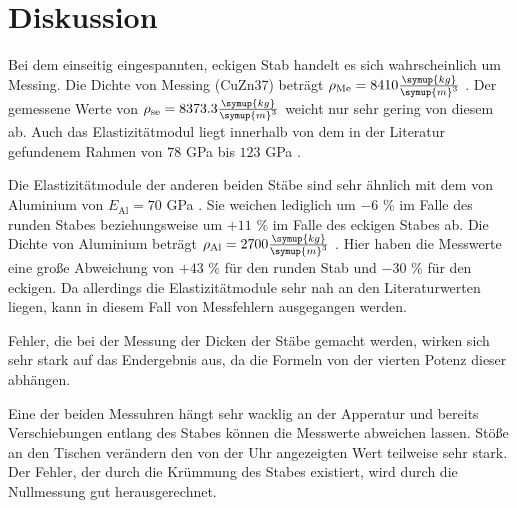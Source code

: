 \section{Diskussion}
\label{sec:Diskussion}

Bei dem einseitig eingespannten, eckigen Stab handelt es sich wahrscheinlich um Messing.
Die Dichte von Messing (CuZn37) beträgt $\rho_\text{Me} = 8410 \frac{\symup{kg}}{\symup{m}^3}$ \cite{messing}. 
Der gemessene Werte von $\rho_\text{se} = 8373.3 \frac{\symup{kg}}{\symup{m}^3}$ weicht nur sehr gering von diesem ab.
Auch das Elastizitätmodul liegt innerhalb von dem in der Literatur gefundenem Rahmen von $78$ GPa bis $123$ GPa \cite{messing}.

Die Elastizitätmodule der anderen beiden Stäbe sind sehr ähnlich mit dem von Aluminium von $E_\text{Al} = 70$ GPa \cite{ela}.
Sie weichen lediglich um $-6$ \% im Falle des runden Stabes beziehungsweise um $+11$ \% im Falle des eckigen Stabes ab.
Die Dichte von Aluminium beträgt $\rho_\text{Al} = 2700 \frac{\symup{kg}}{\symup{m}^3}$ \cite{alu}.
Hier haben die Messwerte eine große Abweichung von $+43$ \% für den runden Stab und $-30$ \% für den eckigen. Da allerdings die Elastizitätmodule sehr nah an den Literaturwerten liegen, kann in diesem Fall von Messfehlern ausgegangen werden.

Fehler, die bei der Messung der Dicken der Stäbe gemacht werden, wirken sich sehr stark auf das Endergebnis aus, da die Formeln von der vierten Potenz dieser abhängen.

Eine der beiden Messuhren hängt sehr wacklig an der Apperatur und bereits Verschiebungen entlang des Stabes können die Messwerte abweichen lassen.
Stöße an den Tischen verändern den von der Uhr angezeigten Wert teilweise sehr stark.
Der Fehler, der durch die Krümmung des Stabes existiert, wird durch die Nullmessung gut herausgerechnet.


